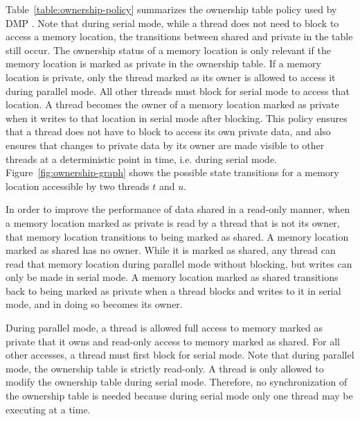 Table~\ref{table:ownership-policy} summarizes the ownership table
policy used by DMP \cite{dmp}.  Note that during serial mode, while a
thread does not need to block to access a memory location, the
transitions between shared and private in the table still occur.  The
ownership status of a memory location is only relevant if the memory
location is marked as private in the ownership table.  If a memory
location is private, only the thread marked as its owner is allowed to
access it during parallel mode.  All other threads must block for
serial mode to access that location.  A thread becomes the owner of a
memory location marked as private when it writes to that location in
serial mode after blocking.  This policy ensures that a thread does
not have to block to access its own private data, and also ensures
that changes to private data by its owner are made visible to other
threads at a deterministic point in time, i.e. during serial mode.
Figure~\ref{fig:ownership-graph} shows the possible state transitions
for a memory location accessible by two threads $t$ and $u$.

In order to improve the performance of data shared in a read-only
manner, when a memory location marked as private is read by a thread
that is not its owner, that memory location transitions to being
marked as shared.  A memory location marked as shared has no owner.
While it is marked as shared, any thread can read that memory location
during parallel mode without blocking, but writes can only be made in
serial mode.  A memory location marked as shared transitions back to
being marked as private when a thread blocks and writes to it in
serial mode, and in doing so becomes its owner.

During parallel mode, a thread is allowed full access to memory marked
as private that it owns and read-only access to memory marked as
shared.  For all other accesses, a thread must first block for serial
mode.  Note that during parallel mode, the ownership table is strictly
read-only.  A thread is only allowed to modify the ownership table
during serial mode.  Therefore, no synchronization of the ownership
table is needed because during serial mode only one thread may be
executing at a time.

